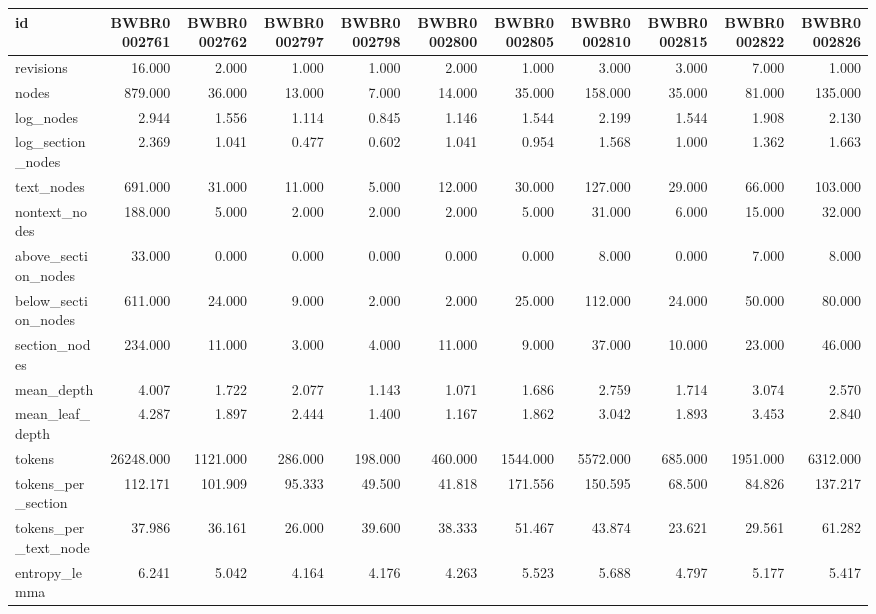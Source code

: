 \begin{tabular}{lrrrrrrrrrr}
\toprule
id & BWBR0002761 & BWBR0002762 & BWBR0002797 & BWBR0002798 & BWBR0002800 & BWBR0002805 & BWBR0002810 & BWBR0002815 & BWBR0002822 & BWBR0002826 \\
\midrule
revisions & 16.000 & 2.000 & 1.000 & 1.000 & 2.000 & 1.000 & 3.000 & 3.000 & 7.000 & 1.000 \\
\cline{1-11}
nodes & 879.000 & 36.000 & 13.000 & 7.000 & 14.000 & 35.000 & 158.000 & 35.000 & 81.000 & 135.000 \\
\cline{1-11}
log\_nodes & 2.944 & 1.556 & 1.114 & 0.845 & 1.146 & 1.544 & 2.199 & 1.544 & 1.908 & 2.130 \\
\cline{1-11}
log\_section\_nodes & 2.369 & 1.041 & 0.477 & 0.602 & 1.041 & 0.954 & 1.568 & 1.000 & 1.362 & 1.663 \\
\cline{1-11}
text\_nodes & 691.000 & 31.000 & 11.000 & 5.000 & 12.000 & 30.000 & 127.000 & 29.000 & 66.000 & 103.000 \\
\cline{1-11}
nontext\_nodes & 188.000 & 5.000 & 2.000 & 2.000 & 2.000 & 5.000 & 31.000 & 6.000 & 15.000 & 32.000 \\
\cline{1-11}
above\_section\_nodes & 33.000 & 0.000 & 0.000 & 0.000 & 0.000 & 0.000 & 8.000 & 0.000 & 7.000 & 8.000 \\
\cline{1-11}
below\_section\_nodes & 611.000 & 24.000 & 9.000 & 2.000 & 2.000 & 25.000 & 112.000 & 24.000 & 50.000 & 80.000 \\
\cline{1-11}
section\_nodes & 234.000 & 11.000 & 3.000 & 4.000 & 11.000 & 9.000 & 37.000 & 10.000 & 23.000 & 46.000 \\
\cline{1-11}
mean\_depth & 4.007 & 1.722 & 2.077 & 1.143 & 1.071 & 1.686 & 2.759 & 1.714 & 3.074 & 2.570 \\
\cline{1-11}
mean\_leaf\_depth & 4.287 & 1.897 & 2.444 & 1.400 & 1.167 & 1.862 & 3.042 & 1.893 & 3.453 & 2.840 \\
\cline{1-11}
tokens & 26248.000 & 1121.000 & 286.000 & 198.000 & 460.000 & 1544.000 & 5572.000 & 685.000 & 1951.000 & 6312.000 \\
\cline{1-11}
tokens\_per\_section & 112.171 & 101.909 & 95.333 & 49.500 & 41.818 & 171.556 & 150.595 & 68.500 & 84.826 & 137.217 \\
\cline{1-11}
tokens\_per\_text\_node & 37.986 & 36.161 & 26.000 & 39.600 & 38.333 & 51.467 & 43.874 & 23.621 & 29.561 & 61.282 \\
\cline{1-11}
entropy\_lemma & 6.241 & 5.042 & 4.164 & 4.176 & 4.263 & 5.523 & 5.688 & 4.797 & 5.177 & 5.417 \\

\end{tabular}
